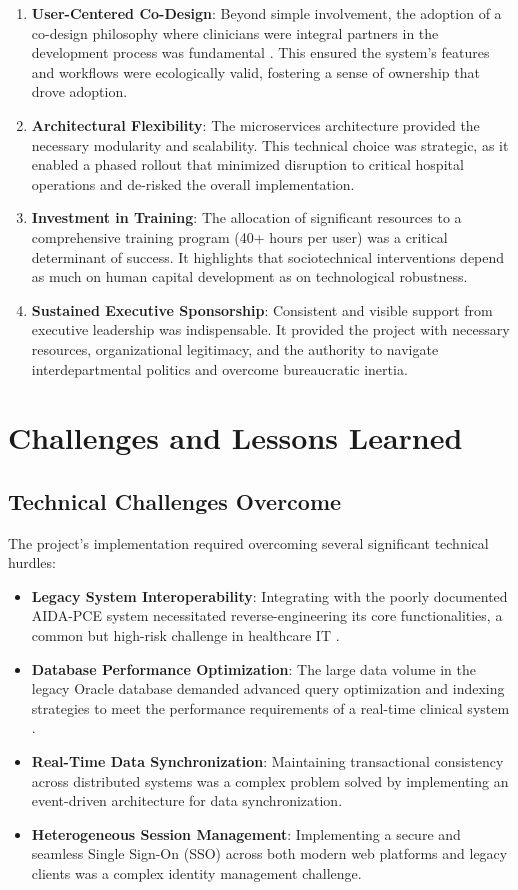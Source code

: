 \begin{enumerate}
    \item \textbf{User-Centered Co-Design}: Beyond simple involvement, the adoption of a co-design philosophy where clinicians were integral partners in the development process was fundamental \cite{venkatesh2003}. This ensured the system's features and workflows were ecologically valid, fostering a sense of ownership that drove adoption.
    \item \textbf{Architectural Flexibility}: The microservices architecture \cite{newman2021} provided the necessary modularity and scalability. This technical choice was strategic, as it enabled a phased rollout that minimized disruption to critical hospital operations and de-risked the overall implementation.
    \item \textbf{Investment in Training}: The allocation of significant resources to a comprehensive training program (40+ hours per user) \cite{kvarnstrom2023} was a critical determinant of success. It highlights that sociotechnical interventions depend as much on human capital development as on technological robustness.
    \item \textbf{Sustained Executive Sponsorship}: Consistent and visible support from executive leadership was indispensable. It provided the project with necessary resources, organizational legitimacy, and the authority to navigate interdepartmental politics and overcome bureaucratic inertia.
\end{enumerate}

\section{Challenges and Lessons Learned}

\subsection{Technical Challenges Overcome}

The project's implementation required overcoming several significant technical hurdles:
\begin{itemize}
    \item \textbf{Legacy System Interoperability}: Integrating with the poorly documented AIDA-PCE system necessitated reverse-engineering its core functionalities, a common but high-risk challenge in healthcare IT \cite{keasberry2017}.
    \item \textbf{Database Performance Optimization}: The large data volume in the legacy Oracle database demanded advanced query optimization and indexing strategies to meet the performance requirements of a real-time clinical system \cite{jiang2014}.
    \item \textbf{Real-Time Data Synchronization}: Maintaining transactional consistency across distributed systems was a complex problem solved by implementing an event-driven architecture for data synchronization.
    \item \textbf{Heterogeneous Session Management}: Implementing a secure and seamless Single Sign-On (SSO) across both modern web platforms and legacy clients was a complex identity management challenge.
\end{itemize}

